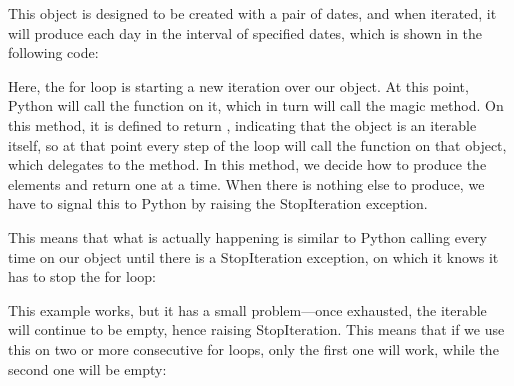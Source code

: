 \documentclass[a4paper,10pt,english]{sphinxmanual}
\begin{document}
This object is designed to be created with a pair of dates, and when iterated, it will produce each day in the interval
of specified dates, which is shown in the following code:

\begin{sphinxVerbatim}[commandchars=\\\{\}]
        
    

\end{sphinxVerbatim}

Here, the for loop is starting a new iteration over our object. At this point, Python will call the  function
on it, which in turn will call the  magic method. On this method, it is defined to return ,
indicating that the object is an iterable itself, so at that point every step of the loop will call the 
function on that object, which delegates to the  method. In this method, we decide how to produce the
elements and return one at a time. When there is nothing else to produce, we have to signal this to Python by raising
the StopIteration exception.

This means that what is actually happening is similar to Python calling  every time on our object until there
is a StopIteration exception, on which it knows it has to stop the for loop:

This example works, but it has a small problem—once exhausted, the iterable will continue to be empty, hence raising
StopIteration. This means that if we use this on two or more consecutive for loops, only the first one will work, while
the second one will be empty:
\end{document}
